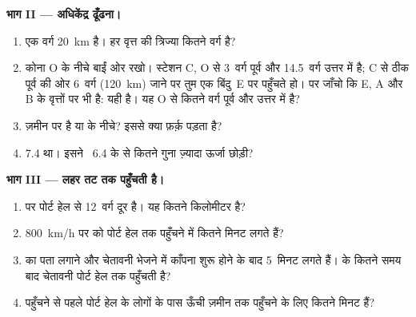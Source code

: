 \begin{problem}
\medskip
\noindent\textbf{भाग II --- अधिकेंद्र ढूँढना।}\par\nopagebreak
\begin{enumerate}[resume, beginpenalty=10000]
  \item एक वर्ग \qty{20}{km} है। हर वृत्त की त्रिज्या कितने वर्ग
        है?
  \item कोना O  के नीचे बाईं ओर रखो। स्टेशन C, O से 3~वर्ग पूर्व और
        14.5~वर्ग उत्तर में है; C से ठीक पूर्व की ओर 6~वर्ग
        (\qty{120}{km}) जाने पर तुम एक बिंदु~E पर पहुँचते हो।  पर जाँचो
        कि E, A और B के वृत्तों पर भी है: यही  है।
        यह O से कितने वर्ग पूर्व और उत्तर में है?
  \item {} ज़मीन पर है या  के नीचे? इससे क्या फ़र्क़ पड़ता है?
  \item {} 7.4 था। इसने ~6.4 के  से कितने गुना ज़्यादा ऊर्जा
        छोड़ी?
\end{enumerate}

\medskip
\noindent\textbf{भाग III --- लहर तट तक पहुँचती है।}\par\nopagebreak
\begin{enumerate}[resume, beginpenalty=10000]
  \item {} पर पोर्ट हेल  से 12~वर्ग दूर है। यह कितने
        किलोमीटर है?
  \item \qty{800}{km/h} पर  को पोर्ट हेल तक पहुँचने में कितने मिनट लगते
        हैं?
  \item {} का पता लगाने और चेतावनी भेजने में काँपना शुरू होने के बाद
        5~मिनट लगते हैं।  के कितने समय बाद चेतावनी पोर्ट हेल तक पहुँचती है?
  \item {} पहुँचने से पहले पोर्ट हेल के लोगों के पास ऊँची ज़मीन तक पहुँचने के
        लिए कितने मिनट हैं?
\end{enumerate}
\end{problem}
